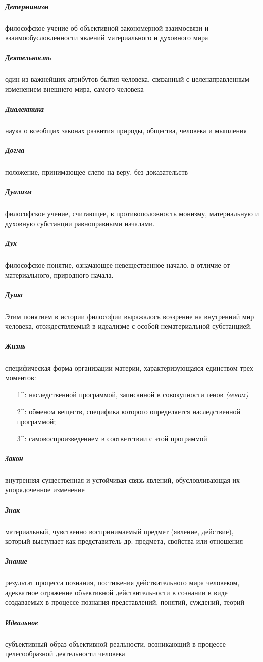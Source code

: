 \documentclass[a4paper, 12pt]{article}
\theoremstyle{plain} %
\theoremstyle{definition} %
\theoremstyle{remark} %
\begin{document}
\subparagraph{Детерминизм}
	философское учение об объективной закономерной взаимосвязи и взаимообусловленности явлений материального и духовного мира

\subparagraph{Деятельность}
	один из важнейших атрибутов бытия человека, связанный с целенаправленным изменением внешнего мира, самого человека

\subparagraph{Диалектика}
	наука о всеобщих законах развития природы, общества, человека и мышления

\subparagraph{Догма}
	 положение, принимающее слепо на веру, без доказательств

\subparagraph{Дуализм}
	философское учение, считающее, в противоположность монизму, материальную и духовную субстанции равноправными началами.

\subparagraph{Дух}
	философское понятие, означающее невещественное начало, в отличие от материального, природного начала.

\subparagraph{Душа}
	Этим понятием в истории философии выражалось воззрение на внутренний мир человека, отождествляемый в идеализме с особой нематериальной субстанцией.

\subparagraph{Жизнь}
	специфическая форма организации материи, характеризующаяся единством трех моментов:
	\begin{itemize}
		\item[1^\circ:] наследственной программой, записанной в совокупности генов \emph{(геном)}
		\item[2^\circ:] обменом веществ, специфика которого определяется наследственной программой;
		\item[3^\circ:] самовоспроизведением в соответствии с этой программой
	\end{itemize}

\subparagraph{Закон}
	внутренняя существенная и устойчивая связь явлений, обусловливающая их упорядоченное изменение

\subparagraph{Знак}
	материальный, чувственно воспринимаемый предмет (явление, действие), который выступает как представитель др. предмета, свойства или отношения

\subparagraph{Знание}
	результат процесса познания, постижения действительного мира человеком, адекватное отражение объективной действительности в сознании в виде создаваемых в процессе познания представлений, понятий, суждений, теорий

\subparagraph{Идеальное}
	субъективный образ объективной реальности, возникающий в процессе целесообразной деятельности человека
\end{document}
